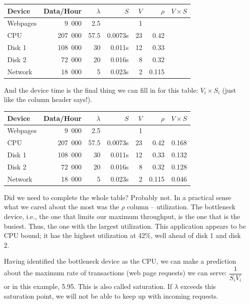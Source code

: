 \documentclass[a4paper]{report}
\begin{document}
\begin{center}
\begin{tabular}{l|r|r|r|r|r|r} 
	\textbf{Device} & \textbf{Data/Hour} & \textbf{$\lambda$} & \textbf{$S$} & \textbf{$V$} & \textbf{$\rho$} & \textbf{$V \times S$} \\ \hline
	Webpages & 9~000 & 2.5 & & 1 & & \\ \hline
	CPU & 207~000 & 57.5 & 0.0073s & 23 & 0.42 & \\ \hline
	Disk 1 & 108~000 & 30 & 0.011s  & 12& 0.33 &\\ \hline
	Disk 2 & 72~000 & 20 & 0.016s & 8 & 0.32 &\\ \hline
	Network & 18~000 & 5 & 0.023s & 2 & 0.115 &
\end{tabular}
\end{center}

And the device time is the final thing we can fill in for this table: $V_{i} \times S_{i}$ (just like the column header says!).

\begin{center}
\begin{tabular}{l|r|r|r|r|r|r}
	\textbf{Device} & \textbf{Data/Hour} & \textbf{$\lambda$} & \textbf{$S$} & \textbf{$V$} & \textbf{$\rho$} & \textbf{$V \times S$} \\ \hline
	Webpages & 9~000 & 2.5 & & 1 & & \\ \hline
	CPU & 207~000 & 57.5 & 0.0073s & 23 & 0.42 & 0.168\\ \hline
	Disk 1 & 108~000 & 30 & 0.011s  & 12& 0.33 & 0.132\\ \hline
	Disk 2 & 72~000 & 20 & 0.016s & 8 & 0.32 & 0.128\\ \hline
	Network & 18~000 & 5 & 0.023s & 2 & 0.115 & 0.046
\end{tabular}
\end{center}

Did we need to complete the whole table? Probably not. In a practical sense what we cared about the most was the $\rho$ column -- utilization. The bottleneck device, i.e., the one that limits our maximum throughput, is the one that is the busiest. Thus, the one with the largest utilization. This application appears to be CPU bound; it has the highest utilization at 42\%, well ahead of disk 1 and disk 2. 

Having identified the bottleneck device as the CPU, we can make a prediction about the maximum rate of transactions (web page requests) we can serve: $\dfrac{1}{S_{i}V_{i}}$ or in this example, 5.95. This is also called saturation. If $\lambda$ exceeds this saturation point, we will not be able to keep up with incoming requests.
\end{document}
